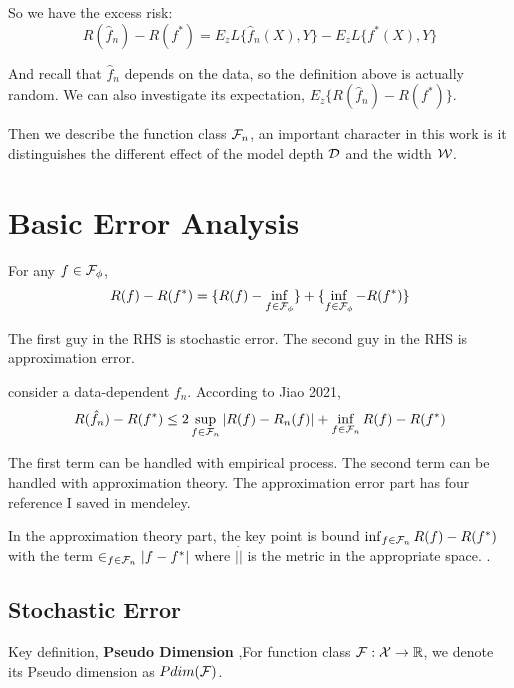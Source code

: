 So we have the excess risk:
$$
R(\hat f_n) - R(f^*) = E_z L\{\hat f_n(X),Y\} - E_z L\{f^*(X),Y\}
$$

And recall that $\hat f_n$ depends on the data, so the definition above is actually random.
We can also investigate its expectation, $E_z\{R(\hat f_n) - R(f^*)\}$.

Then we describe the function class $\mathcal{F}_n$, 
an important character in this work is it distinguishes the different effect of the model depth $\mathcal{D}$ and the width $\mathcal{W}$.

\section{Basic Error Analysis}
For any $f \in \mathcal{F}_\phi$,
\begin{align}
  R(f) - R(f^*) = \{R(f) - \inf_{f\in \mathcal{F}_\phi}\} + \{\inf_{f\in \mathcal{F}_\phi} - R(f^*)\} 
\end{align}

The first guy in the RHS is stochastic error.
The second guy in the RHS is approximation error.

consider a data-dependent $f_n$.
According to Jiao 2021,
\begin{align}
  R(\hat f_n) - R(f^*) \leq 2\sup_{f\in \mathcal{F}_n} |R(f) - R_n(f)| + \inf_{f\in\mathcal{F}_n} R(f) - R(f^*) 
\end{align}

The first term can be handled with empirical process.
The second term can be handled with approximation theory.
The approximation error part has four reference I saved in mendeley.


In the approximation theory part,
the key point is bound $ \inf_{f\in\mathcal{F}_n} R(f) - R(f^*) $ with the term $\in_{f\in\mathcal{F}_n} |f- f^*|$ where $|\dot|$ is the metric in the appropriate space.
.

\subsection{Stochastic Error}
Key definition, \textbf{Pseudo Dimension} 
,For function class $\mathcal{F}: \mathcal{X}\to \mathbb{R}$, we denote its Pseudo dimension as $Pdim(\mathcal{F})$.

